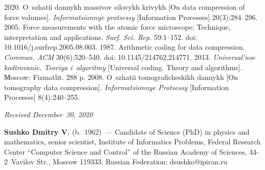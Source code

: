 

  \begin{multicols}{2}

\renewcommand{\bibname}{\protect\rmfamily References}

{\small\frenchspacing
 {%
 \begin{thebibliography}{9}
 2020. O~szhatii dannykh massivov silovykh krivykh [On data compression of force volumes]. 
 \textit{Informatsionnye protsessy} [Information Processes] 20(3):284--296. 
 2005. Force measurements with the atomic force microscope: Technique, interpretation and 
 applications. \textit{Surf. Sci. Rep.} 59:1--152.
 doi: 10.1016/j.surfrep.2005.08.003.
 1987. Arithmetic coding for data compression. \textit{Commun. ACM} 30(6):520--540. 
 doi: 10.1145/214762.214771.
 2013. \textit{Universal'noe kodirovanie. Teoriya i~algoritmy} [Universal coding.
 Theory and algorithms]. Мoscow: Fizmatlit. 288 p. 
 2008. 
O~szhatii tomograficheskikh dannykh [On tomography data compression]. 
\textit{Informatsionnye Protsessy} [Information Processes] 8(4):240--255. 
 \end{thebibliography}

 }
 }

\end{multicols}

\vspace*{-4pt}

  \hfill{\small\textit{Received December~30, 2020}}



\vspace*{-12pt}  

\Contrl

\noindent
\textbf{Sushko Dmitry V.} (b.\ 1962)~--- 
Candidate of Science (PhD) in physics and mathematics, senior scientist, 
Institute of Informatics Problems, Federal Research Center ``Computer 
Science and Control'' of the Russian Academy of Sciences, 44-2~Vavilov Str., 
Moscow 119333, Russian Federation; \mbox{dsushko@ipiran.ru}

\label{end\stat}

\renewcommand{\bibname}{\protect\rm Литература}